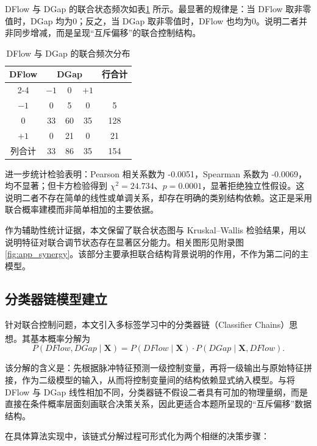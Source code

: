 \documentclass[UTF8,a4paper,12pt]{ctexart}
\newcommand{\upcite}[1]{\textsuperscript{\cite{#1}}}
\begin{document}
DFlow 与 DGap 的联合状态频次如表\ref{tab:joint} 所示。最显著的规律是：当 DFlow 取非零值时，DGap 均为0；反之，当 DGap 取非零值时，DFlow 也均为0。说明二者并非同步增减，而是呈现“互斥偏移”的联合控制结构。

\begin{table}[H]
\centering
\caption{DFlow 与 DGap 的联合频次分布}
\label{tab:joint}
\begin{tabular}{c|ccc|c}
\toprule
\multirow{2}{*}{DFlow} & \multicolumn{3}{c|}{DGap} & \multirow{2}{*}{行合计} \\
\cmidrule(lr){2-4}
& $-1$ & $0$ & $+1$ & \\
\midrule
$-1$ & 0 & 5 & 0 & 5 \\
$0$  & 33 & 60 & 35 & 128 \\
$+1$ & 0 & 21 & 0 & 21 \\
\midrule
列合计 & 33 & 86 & 35 & 154 \\
\bottomrule
\end{tabular}
\end{table}

进一步统计检验表明：Pearson 相关系数为 -0.0051，Spearman 系数为 -0.0069，均不显著；但卡方检验得到 $\chi^2=24.734$、$p=0.0001$，显著拒绝独立性假设。这说明二者不存在简单的线性或单调关系，却存在明确的类别结构依赖。这正是采用联合概率建模而非简单相加的主要依据。

作为辅助性统计证据，本文保留了联合状态图与 Kruskal--Wallis 检验结果，用以说明特征对联合调节状态存在显著区分能力。相关图形见附录图\ref{fig:app_synergy}。该部分主要承担联合结构背景说明的作用，不作为第二问的主模型。
\subsection{分类器链模型建立}

针对联合控制问题，本文引入多标签学习中的分类器链（Classifier Chains）思想\upcite{ref11}。其基本概率分解为
\begin{equation}
P(DFlow,DGap\mid \bm{X})=P(DFlow\mid \bm{X})\cdot P(DGap\mid \bm{X},DFlow).
\label{eq:chain}
\end{equation}

该分解的含义是：先根据脉冲特征预测一级控制变量，再将一级输出与原始特征拼接，作为二级模型的输入，从而将控制变量间的结构依赖显式纳入模型。与将 DFlow 与 DGap 线性相加不同，分类器链不假设二者具有可加的物理量纲，而是直接在条件概率层面刻画联合决策关系，因此更适合本题所呈现的“互斥偏移”数据结构。

在具体算法实现中，该链式分解过程可形式化为两个相继的决策步骤：
\end{document}
